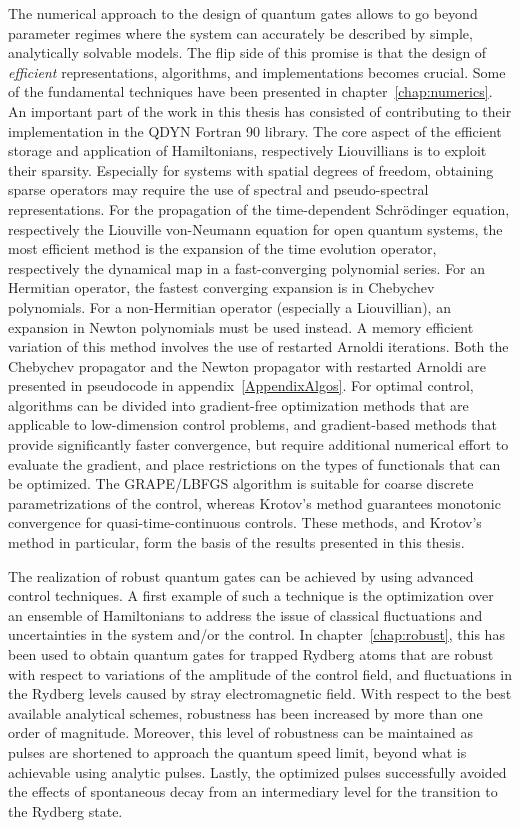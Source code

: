 The numerical approach to the design of quantum gates allows to go beyond
parameter regimes where the system can accurately be described by simple,
analytically solvable models. The flip side of this promise is that the design
of \emph{efficient} representations, algorithms, and implementations becomes
crucial. Some of the fundamental techniques have been presented in
chapter~\ref{chap:numerics}.
An important part of the work in this thesis has consisted of contributing to
their implementation in the QDYN Fortran 90 library.
The core aspect of the efficient storage and
application of Hamiltonians, respectively Liouvillians is to exploit their
sparsity. Especially for systems with spatial degrees of freedom, obtaining
sparse operators may require the use of spectral and pseudo-spectral
representations. For the propagation of the time-dependent Schrödinger equation,
respectively the Liouville von-Neumann equation for open quantum systems, the
most efficient method is the expansion of the time evolution operator,
respectively the dynamical map in a fast-converging polynomial series. For an
Hermitian operator, the fastest converging expansion is in Chebychev
polynomials. For a non-Hermitian operator (especially a Liouvillian), an
expansion in Newton polynomials must be used instead. A memory efficient
variation of this method involves the use of restarted Arnoldi iterations. Both
the Chebychev propagator and the Newton propagator with restarted Arnoldi are
presented in pseudocode in appendix~\ref{AppendixAlgos}. For optimal control,
algorithms can be divided into gradient-free optimization methods that are
applicable to low-dimension control problems, and gradient-based methods that
provide significantly faster convergence, but require additional numerical
effort to evaluate the gradient, and place restrictions on the types of
functionals that can be optimized. The GRAPE/LBFGS algorithm is suitable for
coarse discrete parametrizations of the control, whereas Krotov's method
guarantees monotonic convergence for quasi-time-continuous controls.
These methods, and Krotov's method in particular, form the basis of the
results presented in this thesis.

The realization of robust quantum gates can be achieved by using advanced
control techniques. A first example of such a technique is the optimization over
an ensemble of Hamiltonians to address the issue of classical fluctuations and
uncertainties in the system and/or the control. In chapter~\ref{chap:robust},
this has been used to obtain quantum gates for trapped Rydberg atoms that are
robust with respect to  variations of the amplitude of the control field, and
fluctuations in the Rydberg levels caused by stray electromagnetic field. With
respect to the best available analytical schemes, robustness has been increased
by more than one order of magnitude. Moreover, this level of robustness can be
maintained as pulses are shortened to approach the quantum speed limit, beyond
what is achievable using analytic pulses. Lastly, the optimized pulses
successfully avoided the effects of spontaneous decay from an intermediary level
for the transition to the Rydberg state.

